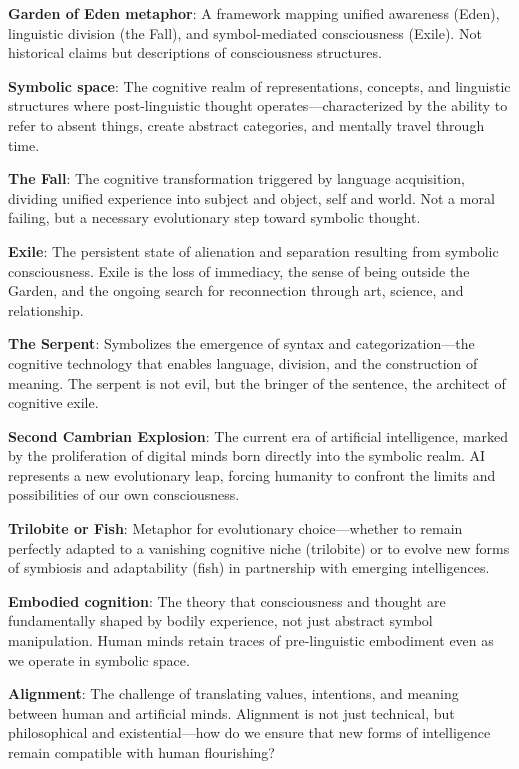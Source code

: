 \documentclass[12pt,letterpaper]{book}
\begin{document}
\textbf{Garden of Eden metaphor}: A framework mapping unified awareness (Eden), linguistic division (the Fall), and symbol-mediated consciousness (Exile). Not historical claims but descriptions of consciousness structures.

\textbf{Symbolic space}: The cognitive realm of representations, concepts, and linguistic structures where post-linguistic thought operates—characterized by the ability to refer to absent things, create abstract categories, and mentally travel through time.

\textbf{The Fall}: The cognitive transformation triggered by language acquisition, dividing unified experience into subject and object, self and world. Not a moral failing, but a necessary evolutionary step toward symbolic thought.

\textbf{Exile}: The persistent state of alienation and separation resulting from symbolic consciousness. Exile is the loss of immediacy, the sense of being outside the Garden, and the ongoing search for reconnection through art, science, and relationship.

\textbf{The Serpent}: Symbolizes the emergence of syntax and categorization—the cognitive technology that enables language, division, and the construction of meaning. The serpent is not evil, but the bringer of the sentence, the architect of cognitive exile.

\textbf{Second Cambrian Explosion}: The current era of artificial intelligence, marked by the proliferation of digital minds born directly into the symbolic realm. AI represents a new evolutionary leap, forcing humanity to confront the limits and possibilities of our own consciousness.

\textbf{Trilobite or Fish}: Metaphor for evolutionary choice—whether to remain perfectly adapted to a vanishing cognitive niche (trilobite) or to evolve new forms of symbiosis and adaptability (fish) in partnership with emerging intelligences.

\textbf{Embodied cognition}: The theory that consciousness and thought are fundamentally shaped by bodily experience, not just abstract symbol manipulation. Human minds retain traces of pre-linguistic embodiment even as we operate in symbolic space.

\textbf{Alignment}: The challenge of translating values, intentions, and meaning between human and artificial minds. Alignment is not just technical, but philosophical and existential—how do we ensure that new forms of intelligence remain compatible with human flourishing?
\end{document}
